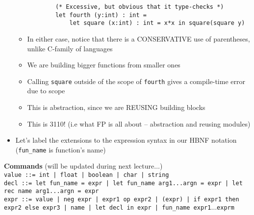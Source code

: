 \begin{itemize}
\begin{itemize}
\begin{lstlisting}
        (* Excessive, but obvious that it type-checks *)
        let fourth (y:int) : int =
            let square (x:int) : int = x*x in square(square y)
        \end{lstlisting}
        \item In either case, notice that there is a CONSERVATIVE use of parentheses, unlike \textsf{C}-family of languages
        \item We are building bigger functions from smaller ones
        \item Calling \texttt{square} outside of the scope of \texttt{fourth} gives a compile-time error due to scope
        \item This is abstraction, since we are REUSING building blocks
        \item This is 3110! (i.e what FP is all about -- abstraction and reusing modules)
    \end{itemize}
    \item Let's label the extensions to the expression syntax in our HBNF notation (\texttt{fun\_name} is function's name)
\end{itemize}

\noindent
\textbf{Commands} (will be updated during next lecture$\ldots$) \\
\texttt{value ::= int | float | boolean | char | string} \\
\texttt{decl ::= \lstinline{let fun_name = expr} | \lstinline{let fun_name arg1...argn = expr} | \lstinline{let rec name arg1...argn = expr}} \\
\texttt{expr ::= value | neg expr | expr1 op expr2 | (expr) | \lstinline{if expr1 then expr2 else expr3} | name | \lstinline{let decl in expr} | fun\_name expr1$\ldots$exprm} \\